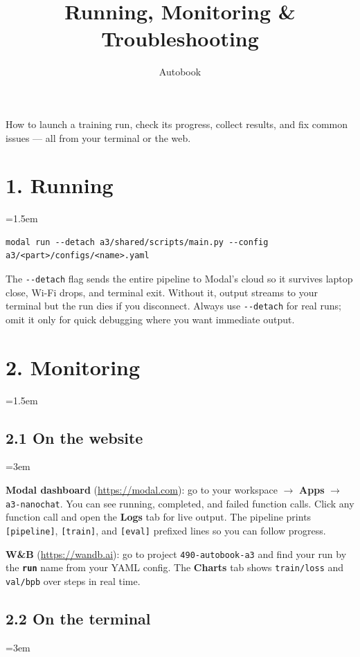 \documentclass[9pt]{extarticle}
\title{\vspace{-1.2cm}\huge\textbf{Running, Monitoring \& Troubleshooting}\vspace{-0.5em}}
\author{\normalsize Autobook}
\date{\vspace{-1.5em}}
\newcommand{\cmd}[1]{\colorbox{gray!10}{\texttt{#1}}}
\newcommand{\field}[1]{\texttt{\textbf{#1}}}
\begin{document}
\maketitle
\thispagestyle{fancy}

How to launch a training run, check its progress, collect results, and fix common issues --- all from your terminal or the web.

\leftskip=0pt
\section*{1. Running}
\leftskip=1.5em

\begin{lstlisting}
modal run --detach a3/shared/scripts/main.py --config a3/<part>/configs/<name>.yaml
\end{lstlisting}

The \cmd{-{}-detach} flag sends the entire pipeline to Modal's cloud so it survives laptop close, Wi-Fi drops, and terminal exit. Without it, output streams to your terminal but the run dies if you disconnect. Always use \cmd{-{}-detach} for real runs; omit it only for quick debugging where you want immediate output.

\leftskip=0pt
\section*{2. Monitoring}
\leftskip=1.5em

\subsection*{2.1 On the website}
\leftskip=3em

\textbf{Modal dashboard} (\url{https://modal.com}): go to your workspace $\to$ \textbf{Apps} $\to$ \cmd{a3-nanochat}. You can see running, completed, and failed function calls. Click any function call and open the \textbf{Logs} tab for live output. The pipeline prints \cmd{[pipeline]}, \cmd{[train]}, and \cmd{[eval]} prefixed lines so you can follow progress.

\textbf{W\&B} (\url{https://wandb.ai}): go to project \cmd{490-autobook-a3} and find your run by the \field{run} name from your YAML config. The \textbf{Charts} tab shows \cmd{train/loss} and \cmd{val/bpb} over steps in real time.

\subsection*{2.2 On the terminal}
\leftskip=3em
\end{document}
